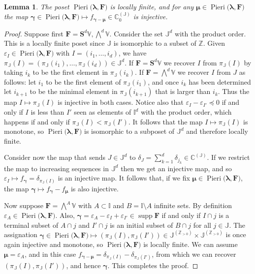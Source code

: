\documentclass[11pt,fleqn]{amsart}
\newcommand\CC{\mathbb C}
\newcommand\ZZ{\mathbb Z}
\newcommand\II{\mathbb I}
\newcommand\JJ{\mathbb J}
\renewcommand\epsilon{\varepsilon}
\newtheorem{lem}[thm]{Lemma}
\theoremstyle{definition}
\theoremstyle{remark}
\theoremstyle{remark}
\newcommand\VV{\mathbb V}
\renewcommand\SS{\mathbf S}
\newcommand\wt[1]{\boldsymbol{#1}}
\DeclareMathOperator\supp{supp}
\newcommand\Pieri[2]{\operatorname{Pieri}{(#1},{#2)}}
\begin{document}
\begin{lem}
\label{lem:Pieri-varia}
The poset $\Pieri{\wt\lambda}{\mathbf F}$ is locally finite, and for any 
$\wt\mu \in \Pieri{\wt\lambda}{\mathbf F}$ the map $\wt\gamma \in 
\Pieri{\wt\lambda}{\mathbf F} \mapsto f_{\wt\gamma - \wt\mu} \in \CC^{(\JJ)}_0$ 
is injective. 
\end{lem}
\begin{proof}
Suppose first $\mathbf F = \SS^d\VV, \bigwedge^d \VV$.
Consider the set $\JJ^d$ with the product order. This is a locally finite poset 
since $\JJ$ is isomorphic to a subset of $\ZZ$.
Given $\epsilon_I \in \Pieri{\wt\lambda}{\mathbf F}$ with $I = 
(i_1, \ldots, i_d)$, we have $\pi_{\JJ}(I) = (\pi_{\JJ}(i_1), \ldots, 
\pi_{\JJ}(i_d)) \in \JJ^d$. If $\mathbf F = \SS^d\VV$ we recover $I$ from 
$\pi_\JJ(I)$ by taking $i_k$ to be the first element in $\pi_\JJ(i_k)$. If 
$\mathbf F = \bigwedge^d \VV$ we recover $I$ from $J$ as follows: let 
$i_1$ to be the first element of $\pi_\JJ(i_1)$, and once $i_k$ has been 
determined let $i_{k+1}$ to be the minimal element in $\pi_\JJ(i_{k+1})$ that 
is larger than $i_k$. Thus the map $I \mapsto \pi_\JJ(I)$ is injective in 
both cases. Notice also that $\epsilon_{I} - \epsilon_{I'} \preceq 0$ if and 
only if $I$ is less than $I'$ seen as elements of $\II^d$ with the product 
order, which happens if and only if $\pi_\JJ(I) < \pi_{\JJ}(I')$. It follows 
that the map $I \mapsto \pi_\JJ(I)$ is monotone, so $\Pieri{\wt\lambda}{\mathbf 
F}$ is isomorphic to a subposet of $\JJ^d$ and therefore locally finite. 

Consider now the map that sends $J \in \JJ^d$ to $\delta_J = \sum_{k=1}^d 
\delta_{j_k} \in \CC^{(\JJ)}$. If we restrict the map to increasing sequences 
in $\JJ^d$ then we get an injective map, and so $ \epsilon_I \mapsto 
f_{\wt\gamma} = \delta_{\pi_\JJ(I)}$ is an injective map. It follows that, if 
we fix $\wt\mu \in \Pieri{\wt\lambda}{\mathbf F}$, the map $\wt\gamma 
\mapsto f_{\wt\gamma} - f_{\wt\mu}$ is also injective.

Now suppose $\mathbf F = \bigwedge^A \VV$ with $A \subset \II$ and $B = \II 
\setminus A$ infinite sets. By definition $\epsilon_A \in \Pieri{\wt\lambda}
{\mathbf F}$. Also, $\wt\gamma = \epsilon_A - \epsilon_I + \epsilon_{I'} \in 
\supp \mathbf F$ if and only if $I \cap j$ is a terminal subset of $A \cap j$ 
and $I' \cap j$ is an initial subset of $B \cap j$ for all $j \in \JJ$. The 
assignation $\wt\gamma \in \Pieri{\wt\lambda}{\mathbf F} \mapsto (\pi_{\JJ}(I), 
\pi_{\JJ}(I')) \in \JJ^{(\ZZ_{>0})} \times \JJ^{(\ZZ_{>0})}$ is once again 
injective and monotone, so $\Pieri{\wt\lambda}{\mathbf F}$ is locally finite. 
We can assume $\wt\mu = \epsilon_A$, and in this case $f_{\wt\gamma - \wt\mu} = 
\delta_{\pi_{\JJ}(I)} - \delta_{\pi_\JJ(I')}$, from which we can recover 
$(\pi_\JJ(I), \pi_\JJ(I'))$, and hence $\wt\gamma$. This completes the proof.
\end{proof}
\end{document}
